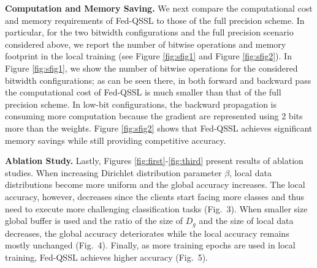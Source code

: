 

{\bf Computation and Memory Saving.}
We next compare the computational cost and memory requirements of Fed-QSSL to those of the full precision scheme. In particular,
for the two bitwidth configurations and the full precision scenario considered above, we report the number of bitwise operations and memory footprint in the local training (see Figure \ref{fig:sfig1} and Figure \ref{fig:sfig2}). In Figure \ref{fig:sfig1}, we show the number of bitwise operations for the considered bitwidth configurations; as can be seen there, in both forward and backward pass the computational cost of Fed-QSSL is much smaller than that of the full precision scheme. In low-bit configurations, the backward propagation is consuming more computation because the gradient are represented using 2 bits more than the weights. Figure \ref{fig:sfig2} shows that Fed-QSSL achieves significant memory savings while still providing competitive accuracy. 



{\bf Ablation Study.}
Lastly, Figures \ref{fig:first}-\ref{fig:third} present results of ablation studies. When increasing Dirichlet distribution parameter $\beta$, local data distributions become more uniform and the global accuracy increases. The local accuracy, however, decreases since the clients start facing more classes and thus need to execute more challenging classification tasks (Fig.~3). When smaller size global buffer is used and the ratio of the size of $D_g$ and the size of local data decreases, the global accuracy deteriorates while the local accuracy remains mostly unchanged (Fig.~4). Finally, as more training epochs are used in local training, Fed-QSSL achieves higher accuracy (Fig.~5).